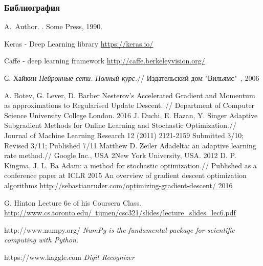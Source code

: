 \documentclass[10pt]{beamer}
\begin{document}
\begin{frame}[allowframebreaks]
  \frametitle<presentation>{Библиография}
    
  \begin{thebibliography}{10}
    
  \beamertemplatebookbibitems

    A.~Author.
    .
    \newblock Some Press, 1990.
 
    
  \beamertemplatearticlebibitems


Keras - Deep Learning library
\href{https://keras.io/}{https://keras.io/}

Caffe - deep learning framework
\href{http://caffe.berkeleyvision.org/}{http://caffe.berkeleyvision.org/}

 С. Хайкин
\emph{Нейронные сети. Полный курс.}// Издательский дом "Вильямс"\ , 2006

A. Botev, G. Lever, D. Barber Nesterov’s Accelerated Gradient and Momentum as approximations to Regularised Update Descent. // Department of Computer Science University College London. 2016
J. Duchi, E. Hazan, Y. Singer
Adaptive Subgradient Methods for Online Learning and Stochastic Optimization.//  Journal of Machine Learning Research 12 (2011) 2121-2159 Submitted 3/10; Revised 3/11; Published 7/11
Matthew D. Zeiler Adadelta: an adaptive learning rate method.// Google Inc., USA 2New York University, USA. 2012
D. P. Kingma, J. L. Ba Adam: a method for stochastic optimization.// Published as a conference paper at ICLR 2015
An overview of gradient descent optimization algorithms
\href{http://sebastianruder.com/optimizing-gradient-descent/ 2016}{http://sebastianruder.com/optimizing-gradient-descent/ 2016}

G. Hinton Lecture 6e of his Coursera Class.
\href{"http://www.cs.toronto.edu/tijmen/csc321/slides/lecture_slides_lec6.pdf"}{http://www.cs.toronto.edu/~tijmen/csc321/slides/lecture\_slides\_lec6.pdf}

 http://www.numpy.org/
\emph{NumPy is the fundamental package for scientific computing with Python.}

 https://www.kaggle.com
\emph{Digit Recognizer}


  \end{thebibliography}
\end{frame}
\end{document}
